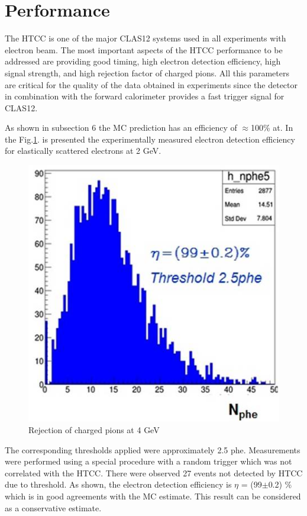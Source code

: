 \section{Performance}The HTCC is one of the major CLAS12 systems used in all experiments with electron beam. The most important aspects of the HTCC performance to be addressed are providing good timing, high electron detection efficiency, high signal strength, and high rejection factor of charged pions. All this parameters are critical for the quality of the data obtained in experiments since the detector in combination with the forward calorimeter provides a fast trigger signal for CLAS12. 

As shown in subsection 6 the MC prediction has an efficiency of $\approx$100\% at. In the Fig.\ref{fig:RAFO_2GeV}. is presented the experimentally measured electron detection efficiency for elastically scattered electrons at 2 GeV. 

\begin{figure}[!ht]
    \centering
    \includegraphics[width=1.0\linewidth,trim={0.0cm 0.0cm 0.0cm 0.0cm},clip]{images/RAFO_2GeV.jpg}
    \caption{Rejection of charged pions at 4 GeV}
    \label{fig:RAFO_2GeV}
\end{figure}

The corresponding thresholds applied were approximately 2.5 phe. Measurements were performed using a special procedure with a random trigger which was not correlated with the HTCC. There were observed 27 events not detected by HTCC due to threshold. As shown, the electron detection efficiency is $\eta$ = (99$\pm$0.2) \% which is in good agreements with the MC estimate. This result can be considered as a conservative estimate.


